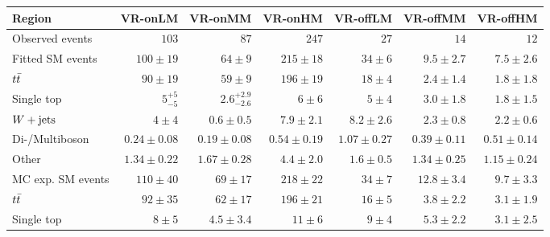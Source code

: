 

\begin{table}
\begin{center}
{\small
\begin{tabular}{lrrrrrr}
\toprule
Region      & VR-onLM            & VR-onMM            & VR-onHM     & VR-offLM            & VR-offMM            & VR-offHM              \\[-0.05cm]
\midrule
Observed events      & $103$              & $87$              & $247$      & $27$              & $14$              & $12$                    \\
\midrule
Fitted SM events    & $100 \pm 19$          & $64 \pm 9$          & $215 \pm 18$      & $34 \pm 6$          & $9.5 \pm 2.7$          & $7.5 \pm 2.6$              \\
\midrule
       $t\bar{t}$      & $90 \pm 19$          & $59 \pm 9$          & $196 \pm 19$   & $18 \pm 4$          & $2.4 \pm 1.4$          & $1.8 \pm 1.8$              \\
        Single top      & $5_{-5}^{+5}$          & $2.6_{-2.6}^{+2.9}$          & $6 \pm 6$     & $5 \pm 4$          & $3.0 \pm 1.8$          & $1.8 \pm 1.5$              \\
        $W+\mathrm{jets}$      & $4 \pm 4$          & $0.6 \pm 0.5$          & $7.9 \pm 2.1$     & $8.2 \pm 2.6$          & $2.3 \pm 0.8$          & $2.2 \pm 0.6$              \\
        Di-/Multiboson       & $0.24 \pm 0.08$          & $0.19 \pm 0.08$          & $0.54 \pm 0.19$   & $1.07 \pm 0.27$          & $0.39 \pm 0.11$          & $0.51 \pm 0.14$              \\
        Other       & $1.34 \pm 0.22$          & $1.67 \pm 0.28$          & $4.4 \pm 2.0$      & $1.6 \pm 0.5$          & $1.34 \pm 0.25$          & $1.15 \pm 0.24$              \\
\toprule
MC exp. SM events     & $110 \pm 40$          & $69 \pm 17$          & $218 \pm 22$          & $34 \pm 7$          & $12.8 \pm 3.4$          & $9.7 \pm 3.3$              \\
\midrule
        $t\bar{t}$           & $92 \pm 35$          & $62 \pm 17$          & $196 \pm 21$     & $16 \pm 5$          & $3.8 \pm 2.2$          & $3.1 \pm 1.9$              \\
       Single top     & $8 \pm 5$          & $4.5 \pm 3.4$          & $11 \pm 6$    & $9 \pm 4$          & $5.3 \pm 2.2$          & $3.1 \pm 2.5$              \\

\end{tabular}}
\end{center}
\end{table}
